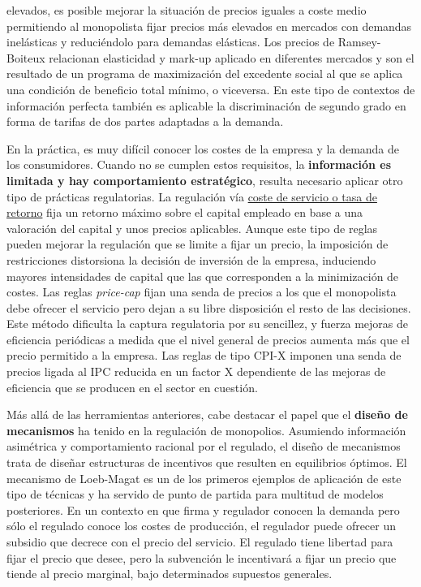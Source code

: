 \documentclass{nuevotema}
\begin{document}
elevados, es posible mejorar la situación de precios iguales a coste medio permitiendo al monopolista fijar precios más elevados en mercados con demandas inelásticas y reduciéndolo para demandas elásticas. Los precios de Ramsey-Boiteux relacionan elasticidad y mark-up aplicado en diferentes mercados y son el resultado de un programa de maximización del excedente social al que se aplica una condición de beneficio total mínimo, o viceversa. En este tipo de contextos de información perfecta también es aplicable la discriminación de segundo grado en forma de tarifas de dos partes adaptadas a la demanda.

En la práctica, es muy difícil conocer los costes de la empresa y la demanda de los consumidores. Cuando no se cumplen estos requisitos, la \textbf{información es limitada y hay comportamiento estratégico}, resulta necesario aplicar otro tipo de prácticas regulatorias. La regulación vía \underline{coste de servicio o tasa de retorno} fija un retorno máximo sobre el capital empleado en base a una valoración del capital y unos precios aplicables. Aunque este tipo de reglas pueden mejorar la regulación que se limite a fijar un precio, la imposición de restricciones distorsiona la decisión de inversión de la empresa, induciendo mayores intensidades de capital que las que corresponden a la minimización de costes. Las reglas \textit{price-cap} fijan una senda de precios a los que el monopolista debe ofrecer el servicio pero dejan a su libre disposición el resto de las decisiones. Este método dificulta la captura regulatoria por su sencillez, y fuerza mejoras de eficiencia periódicas a medida que el nivel general de precios aumenta más que el precio permitido a la empresa. Las reglas de tipo CPI-X imponen una senda de precios ligada al IPC reducida en un factor X dependiente de las mejoras de eficiencia que se producen en el sector en cuestión. 

Más allá de las herramientas anteriores, cabe destacar el papel que el \textbf{diseño de mecanismos} ha tenido en la regulación de monopolios. Asumiendo información asimétrica y comportamiento racional por el regulado, el diseño de mecanismos trata de diseñar estructuras de incentivos que resulten en equilibrios óptimos. El mecanismo de Loeb-Magat es un de los primeros ejemplos de aplicación de este tipo de técnicas y ha servido de punto de partida para multitud de modelos posteriores. En un contexto en que firma y regulador conocen la demanda pero sólo el regulado conoce los costes de producción, el regulador puede ofrecer un subsidio que decrece con el precio del servicio. El regulado tiene libertad para fijar el precio que desee, pero la subvención le incentivará a fijar un precio que tiende al precio marginal, bajo determinados supuestos generales. 
\end{document}
